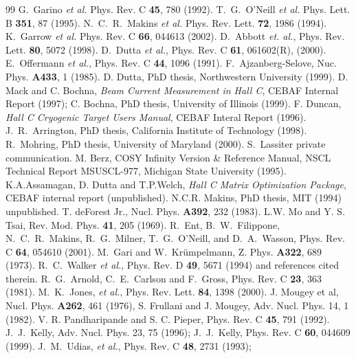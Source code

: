 \documentclass[aps,prl,twocolumn,showpacs,amsmath,amssymb,floats]{revtex4}
\begin{document}
\begin{thebibliography}{99}
G.~Garino {\it et al.} Phys. Rev. C {\bf 45}, 780 (1992).
T.~G.~O'Neill {\it et al.} Phys. Lett. B {\bf 351}, 87 (1995).
N.~C.~R.~Makins {\it et al.} Phys. Rev. Lett. {\bf 72}, 1986 
(1994).
K.~Garrow {\it et al.} Phys. Rev. C {\bf 66}, 044613 (2002).
D.~Abbott {\sl et. al.}, Phys. Rev. Lett. {\bf 80}, 5072 (1998).
D.~Dutta {\it et al.}, Phys. Rev. C {\bf 61}, 061602(R), (2000).
E.~Offermann {\it et al.}, Phys. Rev. C {\bf 44}, 1096 
(1991).
F.~Ajzanberg-Selove, Nuc. Phys. {\bf A433}, 1 (1985).
D. Dutta, PhD thesis, Northwestern University (1999).
D. Mack and C. Bochna, {\sl Beam Current Measurement in Hall C}, 
CEBAF Internal Report (1997); C. Bochna, PhD thesis, University of Illinois (1999).
F. Duncan, {\sl Hall C Cryogenic Target Users Manual}, CEBAF 
Interal Report (1996).
J.~R.~Arrington, PhD thesis, California Institute of Technology (1998).
 R.~Mohring, PhD thesis, University of Maryland (2000).
 S.~Lassiter private communication.
 M. Berz, COSY Infinity Version \& Reference Manual, NSCL 
Technical
Report MSUSCL-977, Michigan State University (1995).
 K.A.Assamagan, D. Dutta and T.P.Welch, {\sl Hall C Matrix 
Optimization Package}, CEBAF internal report (unpublished).  
N.C.R. Makins, PhD thesis, MIT (1994) unpublished.
 T. deForest Jr., Nucl. Phys. {\bf A392}, 232 (1983).
 L.W. Mo and Y. S. Tsai, Rev. Mod. Phys. {\bf 41}, 205 (1969).
R.~Ent, B.~W.~Filippone, N.~C.~R.~Makins, R.~G.~Milner, 
T.~G.~O'Neill, and D.~A.~Wasson, Phys. Rev. C {\bf 64}, 054610 (2001).
M.~Gari and W.~Kr\"{u}mpelmann, Z. Phys. {\bf A322}, 689 (1973).
R.~C.~Walker {\it et al.}, Phys. Rev. D {\bf 49}, 5671 (1994) 
and references cited therein.
R.~G.~Arnold, C.~E.~Carlson and F.~Gross, Phys. Rev. C {\bf 23}, 
363 (1981).
M.~K.~Jones, {\it et al.}, Phys. Rev. Lett. {\bf 84}, 1398 
(2000).
J. Mougey  et al, Nucl. Phys. {\bf A262}, 461 (1976), S. 
Frullani and J. Mougey, Adv. Nucl. Phys. 14, 1 (1982).
V. R. Pandharipande and S. C. Pieper, Phys. Rev. C {\bf 45}, 791 (1992).
J.~J.~Kelly, Adv. Nucl. Phys. 23, 75 (1996);
J.~J.~Kelly, Phys. Rev. C {\bf 60}, 044609 (1999).
J.~M.~Udias, {\it et al.}, Phys. Rev. C {\bf 48}, 2731 (1993);

\end{thebibliography}
\end{document}

